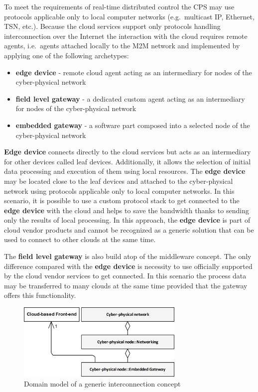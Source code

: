 \documentclass{article}
\begin{document}
To meet the requirements of real-time distributed control the CPS may use protocols applicable only to local computer networks (e.g.~multicast IP, Ethernet, TSN, etc.). Because the cloud services support only protocols handling interconnection over the Internet the interaction with the cloud requires remote agents, i.e.~agents attached locally to the M2M network and implemented by applying one of the following archetypes:

\begin{itemize}
      \item \textbf{edge device} - remote cloud agent acting as an intermediary for nodes of the cyber-physical network
      \item \textbf{field level gateway} - a dedicated custom agent acting as an intermediary for nodes of the cyber-physical network
      \item \textbf{embedded gateway} - a software part composed into a selected node of the cyber-physical network
\end{itemize}

\textbf{Edge device} connects directly to the cloud services but acts as an intermediary for other devices called leaf devices. Additionally, it allows the selection of initial data processing and execution of them using local resources. The \textbf{edge device} may be located close to the leaf devices and attached to the cyber-physical network using protocols applicable only to local computer networks. In this scenario, it is possible to use a custom protocol stack to get connected to the \textbf{edge device} with the cloud and helps to save the bandwidth thanks to sending only the results of local processing. In this approach, the \textbf{edge device} is part of cloud vendor products and cannot be recognized as a generic solution that can be used to connect to other clouds at the same time.

The \textbf{field level gateway} is also build atop of the middleware concept. The only difference compared with the \textbf{edge device} is necessity to use officially supported by the cloud vendor services to get connected. In this scenario the process data may be transferred to many clouds at the same time provided that the gateway offers this functionality.

\begin{figure}
      \centering
      \includegraphics[width=8cm]{../.Media/StrategyDomainModel.png}
      \caption{Domain model of a generic interconnection concept}\label{figure1.StrategyDomainModel}
\end{figure}
\end{document}
